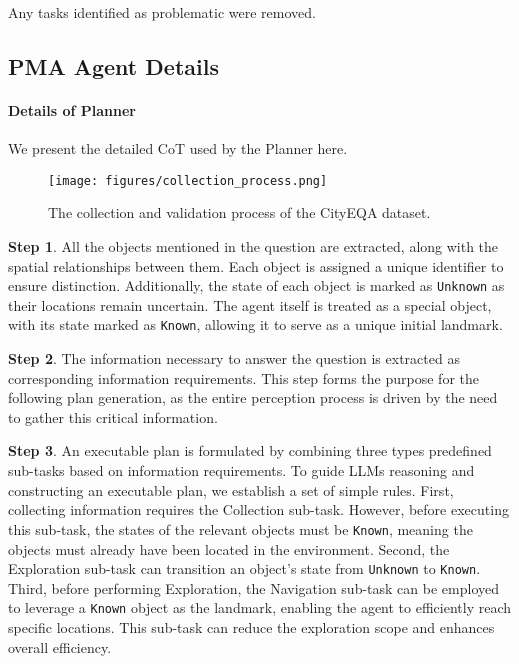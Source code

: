 Any tasks identified as problematic were removed.


\subsection{PMA Agent Details}

\paragraph{Details of Planner}
\label{a_planner}
We present the detailed CoT used by the Planner here.

\begin{figure}[!htb]
\centering
    \texttt{[image: figures/collection\_process.png]}
\caption{The collection and validation process of the CityEQA dataset.}
\label{fig:dataset_collection}
\end{figure}

\textbf{Step 1}. All the objects mentioned in the question are extracted, along with the spatial relationships between them. Each object is assigned a unique identifier to ensure distinction. Additionally, the state of each object is marked as \texttt{Unknown} as their locations remain uncertain. The agent itself is treated as a special object, with its state marked as \texttt{Known}, allowing it to serve as a unique initial landmark.

\textbf{Step 2}. The information necessary to answer the question is extracted as corresponding information requirements. This step forms the purpose for the following plan generation, as the entire perception process is driven by the need to gather this critical information.

\textbf{Step 3}. An executable plan is formulated by combining three types predefined sub-tasks based on information requirements. To guide LLMs reasoning and constructing an executable plan, we establish a set of simple rules. First, collecting information requires the Collection sub-task. However, before executing this sub-task, the states of the relevant objects must be \texttt{Known}, meaning the objects must already have been located in the environment. Second, the Exploration sub-task can transition an object's state from \texttt{Unknown} to \texttt{Known}. Third, before performing Exploration, the Navigation sub-task can be employed to leverage a \texttt{Known} object as the landmark, enabling the agent to efficiently reach specific locations. This sub-task can reduce the exploration scope and enhances overall efficiency.

